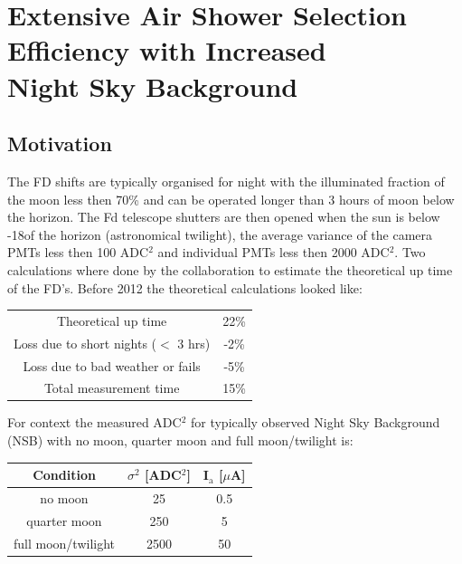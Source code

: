 \chapter[EAS Selection Efficiency with Increased NSB]{\centering Extensive Air Shower Selection Efficiency with Increased \\ Night Sky Background \\}\label{Ch:SelectEff}



\section{Motivation}

The FD shifts are typically organised for night with the illuminated fraction of the moon less then 70\% and can be operated longer than 3 hours of moon below the horizon. The Fd telescope shutters are then opened when the sun is below -18\textdegree of the horizon (astronomical twilight), the average variance of the camera PMTs less then 100 ADC$^2$ and individual PMTs less then 2000 ADC$^2$. Two calculations where done by the collaboration to estimate the theoretical up time of the FD's. Before 2012 the theoretical calculations looked like:

\begin{table}[h]
\centering
\begin{tabular}{c c}
Theoretical up time & 22\% \\
Loss due to short nights ($<$ 3 hrs) & -2\% \\
Loss due to bad weather or fails & -5\% \\ \hline \hline
Total measurement time & 15\% 
\end{tabular}
\end{table}

For context the measured ADC$^2$ for typically observed Night Sky Background (NSB) with no moon, quarter moon and full moon/twilight is:
\begin{table}[h]
\centering
\begin{tabular}{c c c}
\hline\hline
Condition & $\sigma^2$ [ADC$^2$] & I$_{\mathrm{a}}$ [$\mu$A] \\ \hline\hline
no moon & 25 & 0.5 \\
quarter moon & 250 & 5 \\
full moon/twilight & 2500 & 50 \\ \hline\hline
\end{tabular}
\end{table}

